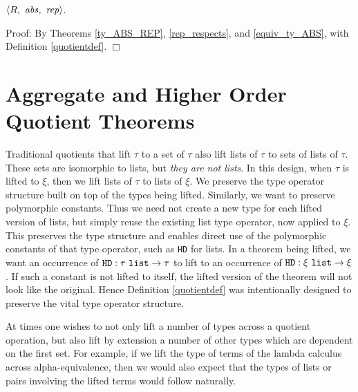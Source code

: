 \documentclass[envcountsame,runningheads]{llncs}
\begin{document}

\begin{theorem}
\label{quotientthm}
$\langle R,\ {\it abs},\ {\it rep} \rangle$.
\end{theorem}
Proof:
By Theorems \ref{ty_ABS_REP},
\ref{rep_respects},
and
\ref{equiv_ty_ABS}, with Definition
\ref{quotientdef}.
$\Box$


%
\section{Aggregate and Higher Order Quotient Theorems}
%
\label{extensions}

Traditional quotients that lift $\tau$ to a set of $\tau$ also
lift lists of $\tau$ to sets of lists of $\tau$.
These sets are isomorphic to lists, but {\it they are not lists}.
In this design, when $\tau$ is lifted to $\xi$, then
we lift lists of $\tau$ to lists of $\xi$.
We preserve the type operator structure built on top of the
types being lifted.  Similarly, we want to preserve polymorphic constants.
Thus we need not create a new type for each lifted version of lists,
but simply reuse the existing list type operator, now applied to $\xi$.
This preserves the type structure and enables direct use
of the polymorphic constants of that type operator, such as
{\tt HD} for lists.
In a theorem being lifted, we want an occurrence of
$\mbox{\tt HD} : \tau\ \mbox{\tt list} \rightarrow \tau$
to lift to an occurrence of
$\mbox{\tt HD} : \xi\ \mbox{\tt list} \rightarrow \xi$.
If such a constant is not lifted to itself, the lifted version
of the theorem will not look like the original.
Hence Definition \ref{quotientdef} was
intentionally
designed
to preserve the vital type operator structure.

\begin{comment}
\end{comment}
At times one wishes to not only lift a number of types across a
quotient operation, but also lift by extension a number of other
types which are dependent on the first set.  For example, if we
lift the type of terms of the lambda calculus across alpha-equivalence,
then we would also expect that the types of lists or pairs involving
the lifted terms would follow naturally.
\end{document}
